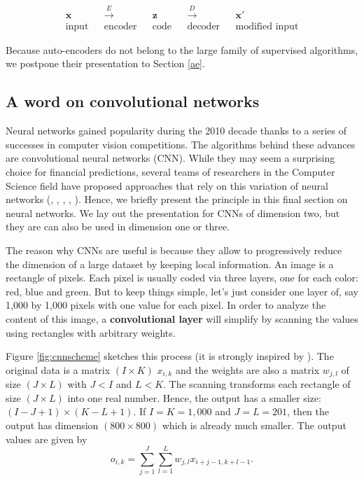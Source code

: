 \documentclass[]{krantz}
\theoremstyle{definition}
\theoremstyle{definition}
\theoremstyle{definition}
\theoremstyle{remark}
\begin{document}
\[\begin{array}{ccccccccc}
\textbf{x} & &\overset{E}{\longrightarrow} && \textbf{z} && \overset{D}{\longrightarrow} && \textbf{x}' \\
\text{input} && \text{encoder} && \text{code} && \text{decoder} && \text{modified input}
\end{array}\]

Because auto-encoders do not belong to the large family of supervised
algorithms, we postpone their presentation to Section \ref{ae}.

\hypertarget{a-word-on-convolutional-networks}{%
\subsection{A word on convolutional
networks}\label{a-word-on-convolutional-networks}}

Neural networks gained popularity during the 2010 decade thanks to a
series of successes in computer vision competitions. The algorithms
behind these advances are convolutional neural networks (CNN). While
they may seem a surprising choice for financial predictions, several
teams of researchers in the Computer Science field have proposed
approaches that rely on this variation of neural networks
(\citet{chen2016financial}, \citet{loreggia2016deep},
\citet{dingli2017financial}, \citet{tsantekidis2017forecasting},
\citet{hoseinzade2019cnnpred}). Hence, we briefly present the principle
in this final section on neural networks. We lay out the presentation
for CNNs of dimension two, but they are can also be used in dimension
one or three.

The reason why CNNs are useful is because they allow to progressively
reduce the dimension of a large dataset by keeping local information. An
image is a rectangle of pixels. Each pixel is usually coded via three
layers, one for each color: red, blue and green. But to keep things
simple, let's just consider one layer of, say 1,000 by 1,000 pixels with
one value for each pixel. In order to analyze the content of this image,
a \textbf{convolutional layer} will simplify by scanning the values
using rectangles with arbitrary weights.

Figure \ref{fig:cnnscheme} sketches this process (it is strongly
inspired by \citet{hoseinzade2019cnnpred}). The original data is a
matrix \((I\times K)\) \(x_{i,k}\) and the weights are also a matrix
\(w_{j,l}\) of size \((J\times L)\) with \(J<I\) and \(L<K\). The
scanning transforms each rectangle of size \((J\times L)\) into one real
number. Hence, the output has a smaller size: \((I-J+1)\times(K-L+1)\).
If \(I=K=1,000\) and \(J=L=201\), then the output has dimension
\((800\times 800)\) which is already much smaller. The output values are
given by \[o_{i,k}=\sum_{j=1}^J\sum_{l=1}^Lw_{j,l}x_{i+j-1,k+l-1}.\]
\end{document}

